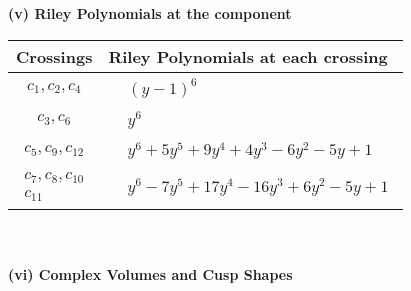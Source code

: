 \documentclass[1p]{elsarticle_modified}
\theoremstyle{definition}
\begin{document}
\newpage\renewcommand{\arraystretch}{1}
\flushleft \textbf{(v) Riley Polynomials at the component}\newline \\
\begin{tabular}{m{50pt}|m{274pt}}
Crossings & \hspace{64pt}Riley Polynomials at each crossing \\
\hline $$\begin{aligned}c_{1},c_{2},c_{4}\end{aligned}$$&$\begin{aligned}
&(y-1)^6
\end{aligned}$\\
\hline $$\begin{aligned}c_{3},c_{6}\end{aligned}$$&$\begin{aligned}
&y^6
\end{aligned}$\\
\hline $$\begin{aligned}c_{5},c_{9},c_{12}\end{aligned}$$&$\begin{aligned}
&y^6+5 y^5+9 y^4+4 y^3-6 y^2-5 y+1
\end{aligned}$\\
\hline $$\begin{aligned}c_{7},c_{8},c_{10}\\c_{11}\end{aligned}$$&$\begin{aligned}
&y^6-7 y^5+17 y^4-16 y^3+6 y^2-5 y+1
\end{aligned}$\\
\hline
\end{tabular}\\~\\
\newpage\flushleft \textbf{(vi) Complex Volumes and Cusp Shapes}
\end{document}
